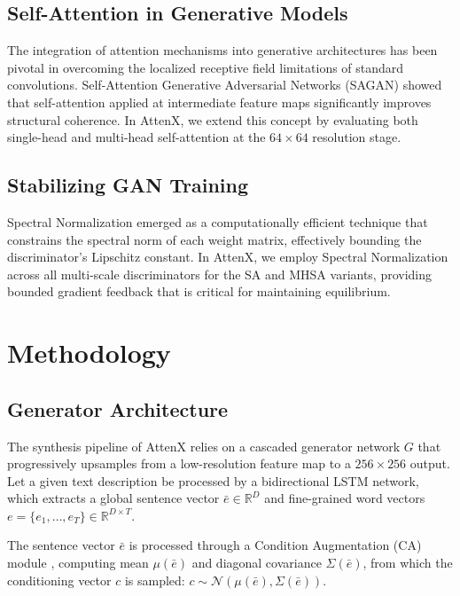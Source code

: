\documentclass[conference]{IEEEtran}
\begin{document}
\subsection{Self-Attention in Generative Models}
The integration of attention mechanisms into generative architectures has been pivotal in overcoming the localized receptive field limitations of standard convolutions. Self-Attention Generative Adversarial Networks (SAGAN) \cite{zhang2019selfattention} showed that self-attention applied at intermediate feature maps significantly improves structural coherence. In AttenX, we extend this concept by evaluating both single-head and multi-head self-attention at the $64 \times 64$ resolution stage.

\subsection{Stabilizing GAN Training}
Spectral Normalization \cite{miyato2018spectral} emerged as a computationally efficient technique that constrains the spectral norm of each weight matrix, effectively bounding the discriminator's Lipschitz constant. In AttenX, we employ Spectral Normalization across all multi-scale discriminators for the SA and MHSA variants, providing bounded gradient feedback that is critical for maintaining equilibrium.

\section{Methodology}

\subsection{Generator Architecture}

The synthesis pipeline of AttenX relies on a cascaded generator network $G$ that progressively upsamples from a low-resolution feature map to a $256 \times 256$ output. Let a given text description be processed by a bidirectional LSTM network, which extracts a global sentence vector $\bar{e} \in \mathbb{R}^{D}$ and fine-grained word vectors $e = \{e_1, \dots, e_T\} \in \mathbb{R}^{D \times T}$.

The sentence vector $\bar{e}$ is processed through a Condition Augmentation (CA) module \cite{zhang2018stackgan}, computing mean $\mu(\bar{e})$ and diagonal covariance $\Sigma(\bar{e})$, from which the conditioning vector $c$ is sampled: $c \sim \mathcal{N}(\mu(\bar{e}), \Sigma(\bar{e}))$.
\end{document}
